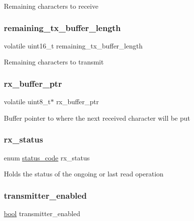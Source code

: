 Remaining characters to receive \mbox{\label{structusart__module_a8031a02be57635012242eb4c9fb21934}} 
\subsubsection{\texorpdfstring{remaining\_tx\_buffer\_length}{remaining\_tx\_buffer\_length}}
{\footnotesize\ttfamily volatile uint16\+\_\+t remaining\+\_\+tx\+\_\+buffer\+\_\+length}

Remaining characters to transmit \mbox{\label{structusart__module_a20cb7f37889a2de5bcd383a2257905f4}} 
\subsubsection{\texorpdfstring{rx\_buffer\_ptr}{rx\_buffer\_ptr}}
{\footnotesize\ttfamily volatile uint8\+\_\+t$\ast$ rx\+\_\+buffer\+\_\+ptr}

Buffer pointer to where the next received character will be put \mbox{\label{structusart__module_a8ffaa16cd35ae2c8e84e357f35ef5aff}} 
\subsubsection{\texorpdfstring{rx\_status}{rx\_status}}
{\footnotesize\ttfamily enum \mbox{\hyperlink{group__group__sam0__utils__status__codes_ga751c892e5a46b8e7d282085a5a5bf151}{status\+\_\+code}} rx\+\_\+status}

Holds the status of the ongoing or last read operation \mbox{\label{structusart__module_a4502b69abc393bd7a0217d1bdd28a200}} 
\subsubsection{\texorpdfstring{transmitter\_enabled}{transmitter\_enabled}}
{\footnotesize\ttfamily \mbox{\hyperlink{group__group__sam0__utils_ga97a80ca1602ebf2303258971a2c938e2}{bool}} transmitter\+\_\+enabled}

